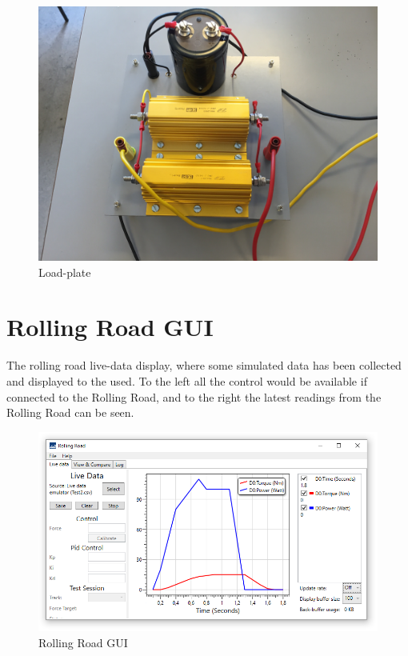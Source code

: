 \begin{figure}[H]
	\centering
	\includegraphics[width=0.7\linewidth]{SubPages/Images/SD_RR_Load}
	\caption{Load-plate}
	\label{fig:SD_RR_Load}
\end{figure}


\section{Rolling Road GUI}

The rolling road live-data display, where some simulated data has been collected and displayed to the used. To the left all the control would be available if connected to the Rolling Road, and to the right the latest readings from the Rolling Road can be seen.

\begin{figure}[H]
	\centering
	\includegraphics[width=0.9\linewidth]{SubPages/Images/SD_GUI}
	\caption{Rolling Road GUI}
	\label{fig:SD_GUI}
\end{figure}
